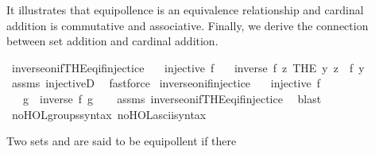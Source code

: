 \begin{isabellebody}
\begin{isamarkuptext}
It illustrates that equipollence is an equivalence relationship and
cardinal addition is commutative and associative. Finally, we derive
the connection between set addition and cardinal addition.%
\end{isamarkuptext}\isamarkuptrue%
\isamarkupfalse%
\ inverse{\isacharunderscore}{\kern0pt}on{\isacharunderscore}{\kern0pt}if{\isacharunderscore}{\kern0pt}THE{\isacharunderscore}{\kern0pt}eq{\isacharunderscore}{\kern0pt}if{\isacharunderscore}{\kern0pt}injectice{\isacharcolon}{\kern0pt}\isanewline
\ \ \ {\isachardoublequoteopen}injective\ f{\isachardoublequoteclose}\isanewline
\ \ \ {\isachardoublequoteopen}inverse\ f\ {\isacharparenleft}{\kern0pt}{\isasymlambda}z{\isachardot}{\kern0pt}\ THE\ y{\isachardot}{\kern0pt}\ z\ {\isacharequal}{\kern0pt}\ f\ y{\isacharparenright}{\kern0pt}{\isachardoublequoteclose}\isanewline
%
\isadelimproof
\ \ %
\endisadelimproof
%
\isatagproof
{}\isamarkupfalse%
\ assms\ injectiveD\ \isamarkupfalse%
\ fastforce%
\endisatagproof
{\isafoldproof}%
%
\isadelimproof
\isanewline
%
\endisadelimproof
\isanewline
{}\isamarkupfalse%
\ inverse{\isacharunderscore}{\kern0pt}on{\isacharunderscore}{\kern0pt}if{\isacharunderscore}{\kern0pt}injectice{\isacharcolon}{\kern0pt}\isanewline
\ \ \ {\isachardoublequoteopen}injective\ f{\isachardoublequoteclose}\isanewline
\ \ \ g\ \ {\isachardoublequoteopen}inverse\ f\ g{\isachardoublequoteclose}\isanewline
%
\isadelimproof
\ \ %
\endisadelimproof
%
\isatagproof
{}\isamarkupfalse%
\ assms\ inverse{\isacharunderscore}{\kern0pt}on{\isacharunderscore}{\kern0pt}if{\isacharunderscore}{\kern0pt}THE{\isacharunderscore}{\kern0pt}eq{\isacharunderscore}{\kern0pt}if{\isacharunderscore}{\kern0pt}injectice\ \isamarkupfalse%
\ blast%
\endisatagproof
{\isafoldproof}%
%
\isadelimproof
\isanewline
%
\endisadelimproof
\isanewline
{}\isamarkupfalse%
\ no{\isacharunderscore}{\kern0pt}HOL{\isacharunderscore}{\kern0pt}groups{\isacharunderscore}{\kern0pt}syntax\ no{\isacharunderscore}{\kern0pt}HOL{\isacharunderscore}{\kern0pt}ascii{\isacharunderscore}{\kern0pt}syntax%
\isadelimdocument
%
\endisadelimdocument
%
\isatagdocument
%
\isamarkuptrue%
%
\endisatagdocument
{\isafolddocument}%
%
\isadelimdocument
%
\endisadelimdocument
%
\begin{isamarkuptext}%
Two sets  and  are said to be equipollent if there

\end{isamarkuptext}
\end{isabellebody}
